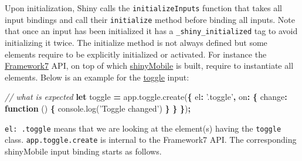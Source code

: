 \documentclass[]{book}
\newenvironment{Shaded}{\begin{snugshade}}{\end{snugshade}}
\newcommand{\AttributeTok}[1]{\textcolor[rgb]{0.77,0.63,0.00}{#1}}
\newcommand{\CommentTok}[1]{\textcolor[rgb]{0.56,0.35,0.01}{\textit{#1}}}
\newcommand{\DataTypeTok}[1]{\textcolor[rgb]{0.13,0.29,0.53}{#1}}
\newcommand{\KeywordTok}[1]{\textcolor[rgb]{0.13,0.29,0.53}{\textbf{#1}}}
\newcommand{\NormalTok}[1]{#1}
\newcommand{\OperatorTok}[1]{\textcolor[rgb]{0.81,0.36,0.00}{\textbf{#1}}}
\newcommand{\StringTok}[1]{\textcolor[rgb]{0.31,0.60,0.02}{#1}}
\newcommand{\VariableTok}[1]{\textcolor[rgb]{0.00,0.00,0.00}{#1}}
\begin{document}
Upon initialization, Shiny calls the \texttt{initializeInputs} function that takes all input bindings and call their \texttt{initialize} method before binding all inputs. Note that once an input has been initialized it has a \texttt{\_shiny\_initialized} tag to avoid initializing it twice. The initialize method is not always defined but some elements require to be explicitly initialized or activated. For instance the \href{https://framework7.io}{Framework7} API, on top of which \href{https://github.com/RinteRface/shinyMobile}{shinyMobile} is built, require to instantiate all elements. Below is an example for the \href{https://framework7.io/docs/toggle.html}{toggle} input:

\begin{Shaded}
\begin{Highlighting}[]
\CommentTok{// what is expected}
\KeywordTok{let}\NormalTok{ toggle }\OperatorTok{=} \VariableTok{app}\NormalTok{.}\VariableTok{toggle}\NormalTok{.}\AttributeTok{create}\NormalTok{(}\OperatorTok{\{}
  \DataTypeTok{el}\OperatorTok{:} \StringTok{'.toggle'}\OperatorTok{,}
  \DataTypeTok{on}\OperatorTok{:} \OperatorTok{\{}
    \DataTypeTok{change}\OperatorTok{:} \KeywordTok{function}\NormalTok{ () }\OperatorTok{\{}
      \VariableTok{console}\NormalTok{.}\AttributeTok{log}\NormalTok{(}\StringTok{'Toggle changed'}\NormalTok{)}
    \OperatorTok{\}}
  \OperatorTok{\}}
\OperatorTok{\}}\NormalTok{)}\OperatorTok{;}
\end{Highlighting}
\end{Shaded}

\texttt{el:\ \textquotesingle{}.toggle\textquotesingle{}} means that we are looking at the element(s) having the \texttt{toggle} class. \texttt{app.toggle.create} is internal to the Framework7 API. The corresponding shinyMobile input binding starts as follows.

\begin{Shaded}
\end{Shaded}
\end{document}
